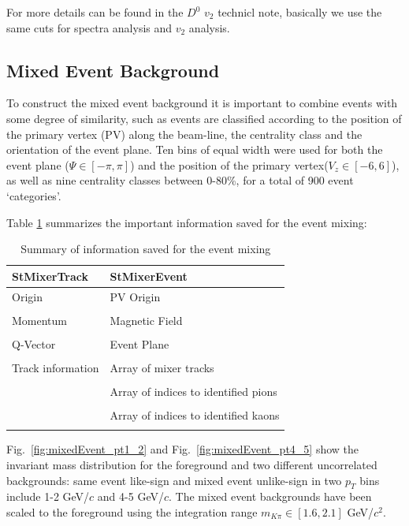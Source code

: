 For more details can be found in the $D^0$ $v_2$ technicl note, basically we use the same cuts for spectra analysis and $v_2$ analysis.

\subsection{Mixed Event Background}

To construct the mixed event background it is important to combine events with some degree of similarity, such as events are classified according to the position of the primary vertex (PV) along the beam-line, the centrality class and the orientation of the event plane. Ten bins of equal width were used for both the event plane ($\Psi\in[-\pi,\pi]$) and the position of the primary vertex($V_z\in[-6,6]$), as well as nine centrality classes between 0-80\%, for a total of 900 event `categories'.

Table \ref{eventBuf} summarizes the important information saved for the event mixing:

\begin{table}[htp]
\centering
\caption{Summary of information saved for the event mixing}
\label{eventBuf}
\begin{tabular}{ l | l  }
\toprule[1.6pt]
StMixerTrack & StMixerEvent \\
\midrule[1.2pt]
Origin & PV Origin \\
\\
Momentum & Magnetic Field \\
\\
Q-Vector & Event Plane \\
\\
Track information & Array of mixer tracks \\
\\
  &Array of indices to identified pions \\
\\
  & Array of indices to identified kaons \\
\\
\bottomrule[1.6pt]
\end{tabular}
\end{table}

Fig.~\ref{fig:mixedEvent_pt1_2} and Fig.~\ref{fig:mixedEvent_pt4_5} show the invariant mass distribution for the foreground and two different uncorrelated backgrounds: same event like-sign and mixed event unlike-sign in two $p_T$ bins include 1-2 GeV/$c$ and 4-5 GeV/$c$. The mixed event backgrounds have been scaled to the foreground using the integration range $m_{K\pi}\in[1.6,2.1]$ GeV/$c^{2}$.

